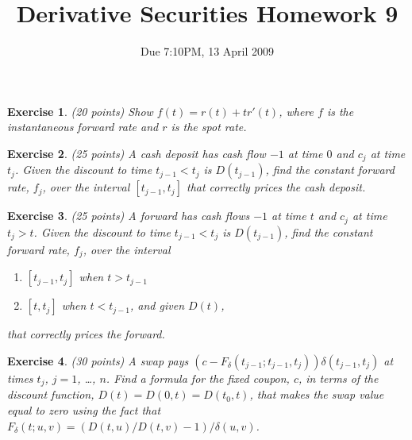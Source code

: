 \documentclass[11pt,fleqn]{amsproc}
\newtheorem{xca}{Exercise}
\begin{document}
\title{Derivative Securities Homework 9}
\author{Due 7:10PM, 13 April 2009}

\maketitle


\begin{xca}{(20 points)}
Show $f(t) = r(t) + t r'(t)$, where $f$ is the instantaneous forward rate and
$r$ is the spot rate.
\end{xca}

\begin{xca}{(25 points)}
A cash deposit has cash flow $-1$ at time $0$ and $c_j$ at time $t_j$. Given
the discount to time $t_{j-1} < t_j$ is $D(t_{j-1})$, find the constant forward rate, $f_j$,
over the interval $[t_{j-1}, t_j]$ that correctly prices the cash deposit.
\end{xca}

\begin{xca}{(25 points)}
A forward has cash flows $-1$ at time $t$ and $c_j$ at time $t_j > t$. Given
the discount to time $t_{j-1} < t_j$ is $D(t_{j-1})$, find the constant forward rate, $f_j$,
over the interval
\begin{enumerate}
\item $[t_{j-1}, t_j]$ when $t > t_{j-1}$
\item $[t, t_j]$ when $t < t_{j-1}$, and given $D(t)$,
\end{enumerate}
that correctly prices the forward.
\end{xca}

\begin{xca}{(30 points)}
A swap pays $(c - F_\delta(t_{j-1}; t_{j-1}, t_j))\delta(t_{j-1}, t_j)$ at times $t_j$, $j = 1$, \dots, $n$.
Find a formula for the fixed coupon, $c$, in terms of the discount function, $D(t) = D(0,t) = D(t_0, t)$, that makes the
swap value equal to zero using the fact that $F_\delta(t; u, v) = (D(t, u)/D(t, v) - 1)/\delta(u, v)$.
\end{xca}
\end{document}
